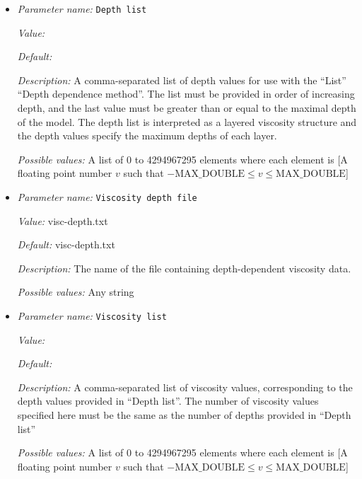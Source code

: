 \begin{itemize}
{\it Default:} None


{\it Description:} Method that is used to specify how the viscosity should vary with depth. 


{\it Possible values:} Any one of Function, File, List, None
\item {\it Parameter name:} {\tt Depth list}
\label{parameters:Material model/Depth dependent model/Depth list}
\label{parameters:Material_20model/Depth_20dependent_20model/Depth_20list}


{\it Value:} 


{\it Default:} 


{\it Description:} A comma-separated list of depth values for use with the ``List'' ``Depth dependence method''. The list must be provided in order of increasing depth, and the last value must be greater than or equal to the maximal depth of the model. The depth list is interpreted as a layered viscosity structure and the depth values specify the maximum depths of each layer. 


{\it Possible values:} A list of 0 to 4294967295 elements where each element is [A floating point number $v$ such that $-\text{MAX\_DOUBLE} \leq v \leq \text{MAX\_DOUBLE}$]
\item {\it Parameter name:} {\tt Viscosity depth file}
\label{parameters:Material model/Depth dependent model/Viscosity depth file}
\label{parameters:Material_20model/Depth_20dependent_20model/Viscosity_20depth_20file}


{\it Value:} visc-depth.txt


{\it Default:} visc-depth.txt


{\it Description:} The name of the file containing depth-dependent viscosity data. 


{\it Possible values:} Any string
\item {\it Parameter name:} {\tt Viscosity list}
\label{parameters:Material model/Depth dependent model/Viscosity list}
\label{parameters:Material_20model/Depth_20dependent_20model/Viscosity_20list}


{\it Value:} 


{\it Default:} 


{\it Description:} A comma-separated list of viscosity values, corresponding to the depth values provided in ``Depth list''. The number of viscosity values specified here must be the same as the number of depths provided in ``Depth list'' 


{\it Possible values:} A list of 0 to 4294967295 elements where each element is [A floating point number $v$ such that $-\text{MAX\_DOUBLE} \leq v \leq \text{MAX\_DOUBLE}$]
\end{itemize}



